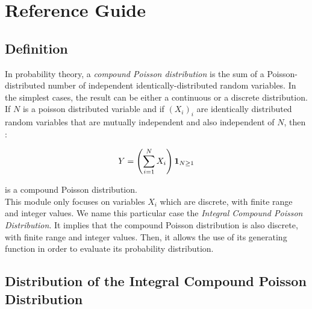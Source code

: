 % 




\section{Reference Guide}

\subsection{Definition}

In probability theory, a \emph{compound Poisson distribution}  is the sum of a Poisson-distributed number of independent identically-distributed random variables. In the simplest cases, the result can be either a continuous or a discrete distribution.\\
If $N$ is a poisson distributed variable and if $(X_i)_i$ are identically distributed random variables that are mutually independent and also independent of $N$, then :

\begin{equation}
Y = \left( \displaystyle \sum_{i=1}^{N}X_i \right){\mathbf 1}_{N\geq 1}
\end{equation}

is a compound Poisson distribution.\\

This module only focuses on  variables $X_i$ which are discrete, with finite range and integer values. We name this particular case the \emph{Integral Compound Poisson Distribution}. It implies that the compound Poisson distribution is also discrete, with finite range and integer values. Then, it allows the use of its generating function in order to evaluate its probability distribution.




\subsection{Distribution of the Integral Compound Poisson Distribution }\label{loiY}

